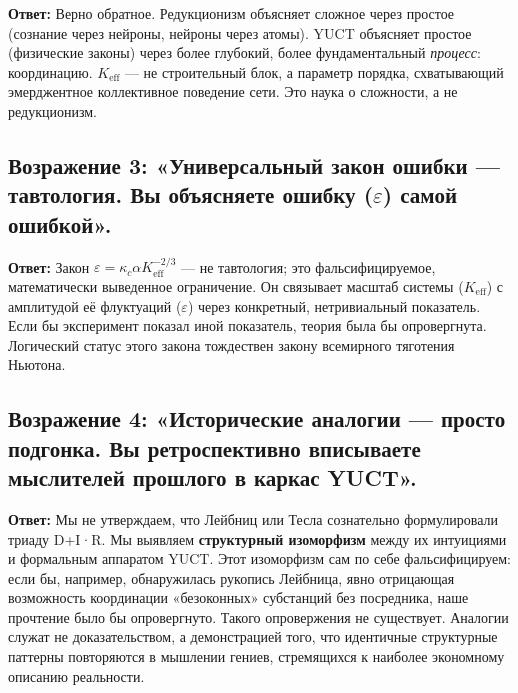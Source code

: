 \documentclass[12pt,a4paper]{article}
\begin{document}
	\textbf{Ответ:} Верно обратное. Редукционизм объясняет сложное через простое (сознание через нейроны, нейроны через атомы). YUCT объясняет простое (физические законы) через более глубокий, более фундаментальный \emph{процесс}: координацию. \(K_{\mathrm{eff}}\) — не строительный блок, а параметр порядка, схватывающий эмерджентное коллективное поведение сети. Это наука о сложности, а не редукционизм.
	
	\subsection*{Возражение 3: «Универсальный закон ошибки — тавтология. Вы объясняете ошибку (\(\varepsilon\)) самой ошибкой».}
	
	\textbf{Ответ:} Закон \(\varepsilon = \kappa_c \alpha K_{\mathrm{eff}}^{-2/3}\) — не тавтология; это фальсифицируемое, математически выведенное ограничение. Он связывает масштаб системы (\(K_{\mathrm{eff}}\)) с амплитудой её флуктуаций (\(\varepsilon\)) через конкретный, нетривиальный показатель. Если бы эксперимент показал иной показатель, теория была бы опровергнута. Логический статус этого закона тождествен закону всемирного тяготения Ньютона.
	
	\subsection*{Возражение 4: «Исторические аналогии — просто подгонка. Вы ретроспективно вписываете мыслителей прошлого в каркас YUCT».}
	
	\textbf{Ответ:} Мы не утверждаем, что Лейбниц или Тесла сознательно формулировали триаду D+I·R. Мы выявляем \textbf{структурный изоморфизм} между их интуициями и формальным аппаратом YUCT. Этот изоморфизм сам по себе фальсифицируем: если бы, например, обнаружилась рукопись Лейбница, явно отрицающая возможность координации «безоконных» субстанций без посредника, наше прочтение было бы опровергнуто. Такого опровержения не существует. Аналогии служат не доказательством, а демонстрацией того, что идентичные структурные паттерны повторяются в мышлении гениев, стремящихся к наиболее экономному описанию реальности.
	
\end{document}
